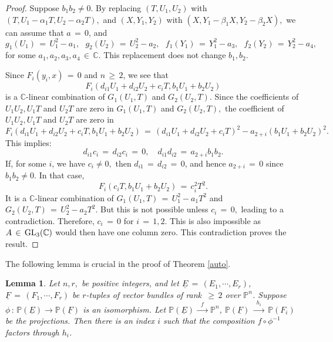 \documentclass[12pt,reqno]{amsart}
\newtheorem{lemma}{Lemma}[section]
\theoremstyle{definition}
\numberwithin{equation}{section}
\begin{document}
\begin{proof}
Suppose $b_1b_2\neq0.$
By replacing $(T, U_{1},U_{2})$ with $ (T,U_{1}-\alpha_{1}T,U_{2}-\alpha_{2}T),$ and $ (X,Y_{1}, Y_{2})$ with $ (X,Y_{1}-\beta_{1}X ,Y_{2}-\beta_{2}X),$ we can assume that $a\,=\,0$, and
$$ g_{1}(U_{1})\,=\, U_{1}^{2}-a_{1}, \,\,\,\, g_{2}(U_{2})\,=\, U_{2}^{2}- a_{2},\,\,\,\, f_{1}(Y_{1})\,=\, Y_{1}^{2}- a_{3},\,\,\,\, f_{2}(Y _{2})\,=\, Y_{2}^2 - a_{4},$$
for some $ a_{1}, a_{2}, a_{3}, a_{4} \,\in\, \mathbb{C}$. This replacement does not change $b_{1},b_{2}.$ 

Since $F_{i}(y_{i},x)\,=\,0$ and $n\,\geq\, 2$, we see that  
\begin{equation*}
F_{i}(d_{i1}U_{1}+d_{i2}U_{2}+c_{i}T, b_{1}U_{1}+ b_{2}U_{2})
\end{equation*}
is a $\mathbb{C}$-linear combination of $G_{1}(U_{1},T)$ and $ G_{2}(U_{2}, T).$ Since the coefficients of $ U_{1}U_{2}, U_{1}T$ and $ U_{2}T$ are zero in $ G_{1}(U_{1},T)$ and $ G_{2}(U_{2},T),$ the coefficient of $ U_{1}U_{2}, U_{1}T$ and $U_{2}T$ are zero in 
 $$ F_{i}(d_{i1}U_{1}+d_{i2}U_{2}+c_{i}T, b_{1}U_{1}+ b_{2}U_{2}) \,=\, (d_{i1}U_{1}+ d_{i2}U_{2} + c_{i}T)^{2}- a_{2+i}(b_{1}U_{1}+b_{2}U_{2})^{2}.$$
This implies: 
\begin{equation*}
d_{i1} c_{i}\,=\, d_{i2}c_{i}\,=\,0, \quad
 d_{i1}d_{i2}\,=\,a_{2+i}b_{1}b_{2}.
\end{equation*}
If, for some $i$, we have $c_{i} \neq 0,$ then $d_{i1}\,=\,d_{i2}\,=\,0 $, and hence $a_{2+i}\,=\,0$ since $b_1b_2\neq 0.$ In that case, 
\begin{equation*}
F_{i}(c_{i}T, b_{1}U_{1}+b_{2}U_{2}) \,=\, c_{i}^{2}T^{2}.
\end{equation*}
It is a $\mathbb{C}$-linear combination of $G_{1}(U_{1},T)\,=\,U_{1}^{2}-a_{1}T^2$ and $G_{2}(U_{2},T)\,=\,U_{2}^{2}-a_{2}T^2.  $ But this is not possible unless $c_{i}\,=\,0,$ leading to a contradiction. Therefore, $c_{i}\,=\,0$ for $i \,=\, 1,2.$ This is also impossible as $A\,\in\, \textnormal{GL}_{3}(\mathbb{C})$ would then have one column zero. This contradiction proves the result.      
\end{proof}
The following lemma is crucial in the proof of Theorem \ref{auto}.
\begin{lemma}\label{factor}
Let $n,r,$ be positive integers, and let $\underline{E}\,=\,(E_{1},\cdots,E_{r })$, $\underline{F}\,=\,(F_{1},\cdots,F_{r })$ be $r$-tuples of vector bundles of rank $\,\geq\, 2$ over $\mathbb{P}^n$. Suppose $ \phi\,:\, \mathbb{P}(\underline{E})\to \mathbb{P}(\underline{F})$ is an isomorphism. Let $\mathbb{P}(\underline{E})\,\xrightarrow{\,\,\,f\,\,\,}\, \mathbb{P}^n$, $\mathbb{P}(\underline{F})\,\xrightarrow{\,\,\,h_i\,\,\,}\, \mathbb{P}(F_i)$ be the projections. Then there is an index $i$ such that the composition $f\circ \phi^{-1}$ factors through $h_i$.
\end{lemma}
\end{document}
